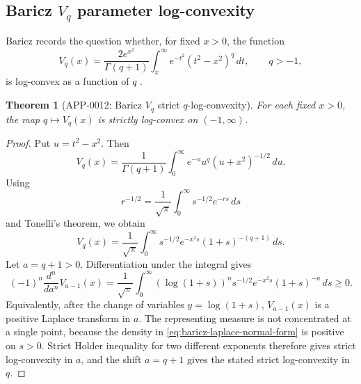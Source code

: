 \documentclass[11pt]{article}
\numberwithin{equation}{section}
\newtheorem{theorem}{Theorem}[section]
\theoremstyle{definition}
\theoremstyle{remark}
\newcommand{\1}{\mathbf 1}
\begin{document}
\subsection{Baricz \(V_q\) parameter log-convexity}

Baricz records the question whether, for fixed \(x>0\), the function
\begin{equation}
\label{eq:baricz-vq-definition}
V_q(x)=\frac{2e^{x^2}}{\Gamma(q+1)}
\int_x^\infty e^{-t^2}(t^2-x^2)^q\,dt,
\qquad q>-1,
\end{equation}
is log-convex as a function of \(q\) \cite{baricz-turan-thesis}.

\begin{theorem}[APP-0012: Baricz \(V_q\) strict \(q\)-log-convexity]
\label{thm:baricz-vq-strict-logconvexity}
For each fixed \(x>0\), the map \(q\mapsto V_q(x)\) is strictly log-convex on \((-1,\infty)\).
\end{theorem}

\begin{proof}
Put \(u=t^2-x^2\).  Then
\begin{equation}
\label{eq:baricz-u-normal-form}
V_q(x)=\frac1{\Gamma(q+1)}
\int_0^\infty e^{-u}u^q(u+x^2)^{-1/2}\,du.
\end{equation}
Using
\[
r^{-1/2}=\frac1{\sqrt\pi}\int_0^\infty s^{-1/2}e^{-rs}\,ds
\]
and Tonelli's theorem, we obtain
\begin{equation}
\label{eq:baricz-laplace-normal-form}
V_q(x)=\frac1{\sqrt\pi}\int_0^\infty
s^{-1/2}e^{-x^2s}(1+s)^{-(q+1)}\,ds.
\end{equation}
Let \(a=q+1>0\).  Differentiation under the integral gives
\begin{equation}
\label{eq:baricz-complete-monotonicity}
(-1)^n\frac{d^n}{da^n}V_{a-1}(x)
=\frac1{\sqrt\pi}\int_0^\infty
(\log(1+s))^n s^{-1/2}e^{-x^2s}(1+s)^{-a}\,ds\ge0.
\end{equation}
Equivalently, after the change of variables \(y=\log(1+s)\), \(V_{a-1}(x)\) is a positive Laplace transform in \(a\).  The representing measure is not concentrated at a single point, because the density in \eqref{eq:baricz-laplace-normal-form} is positive on \(s>0\).  Strict Holder inequality for two different exponents therefore gives strict log-convexity in \(a\), and the shift \(a=q+1\) gives the stated strict log-convexity in \(q\).
\end{proof}
\end{document}
